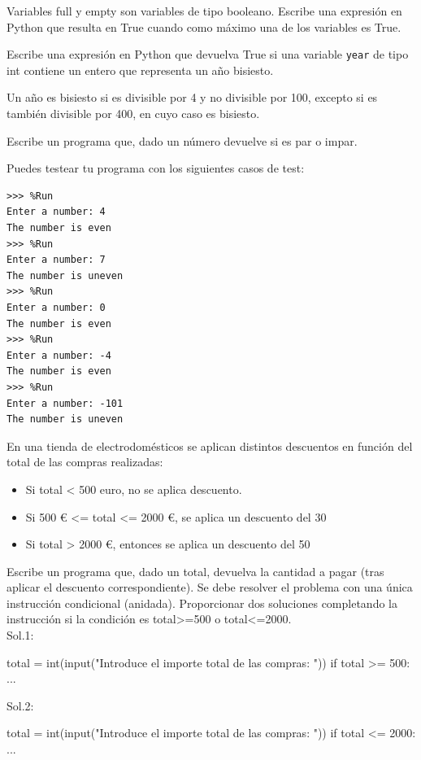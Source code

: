 \begin{ejercicio}Variables full y empty son variables de tipo booleano. Escribe una expresión en Python que resulta en True cuando como máximo una de los variables es True.
\end{ejercicio}

\begin{ejercicio}
Escribe una expresión en Python que devuelva True si una variable \verb|year| de tipo int contiene un entero que representa un año bisiesto.

Un año es bisiesto si es divisible por 4 y no divisible por 100, excepto si es también divisible por 400, en cuyo caso es bisiesto.
\end{ejercicio}



\begin{ejercicio}Escribe un programa que, dado un número devuelve si es par o impar.

Puedes testear tu programa con los siguientes casos de test:\\

\begin{Verbatim}[frame=single, label={\em example test execution of the program}]
>>> %Run 
Enter a number: 4
The number is even
>>> %Run 
Enter a number: 7
The number is uneven
>>> %Run 
Enter a number: 0
The number is even
>>> %Run 
Enter a number: -4
The number is even
>>> %Run 
Enter a number: -101
The number is uneven
\end{Verbatim}
\end{ejercicio}


\begin{ejercicio}En una tienda de electrodomésticos se aplican distintos descuentos en función del total de las compras realizadas:

\begin{itemize}
\item Si total < 500 euro, no se aplica descuento.
\item Si 500 € <= total <= 2000 €, se aplica un descuento del 30%
\item Si total > 2000 €, entonces se aplica un descuento del 50%
\end{itemize}


Escribe un programa que, dado un total, devuelva la cantidad a pagar (tras aplicar el descuento correspondiente). Se debe resolver el problema con una única instrucción condicional (anidada). Proporcionar dos soluciones completando la instrucción si la condición es total>=500 o total<=2000.\\

Sol.1:
\begin{python}
total = int(input("Introduce el importe total de las compras: "))
if total >= 500:
...
\end{python}

Sol.2:
\begin{python}
total = int(input("Introduce el importe total de las compras: "))
if total <= 2000:
...
\end{python}
\end{ejercicio}



